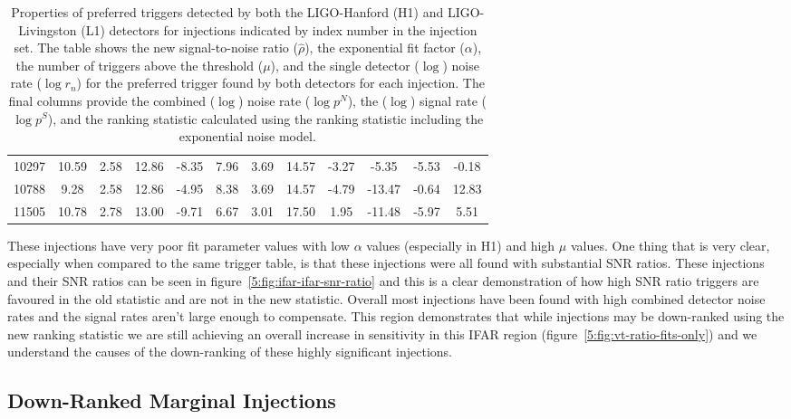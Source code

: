 \begin{table}[ht]
\begin{tabular}{lccccccccccc}
        10297 & 10.59 & 2.58 & 12.86 & -8.35 & 7.96 & 3.69 & 14.57 & -3.27 & -5.35 & -5.53 & -0.18 \\
        10788 & 9.28 & 2.58 & 12.86 & -4.95 & 8.38 & 3.69 & 14.57 & -4.79 & -13.47 & -0.64 & 12.83 \\
        11505 & 10.78 & 2.78 & 13.00 & -9.71 & 6.67 & 3.01 & 17.50 & 1.95 & -11.48 & -5.97 & 5.51 \\
        \bottomrule
    \end{tabular}
    \caption{Properties of preferred triggers detected by both the LIGO-Hanford (H1) and LIGO-Livingston (L1) detectors for injections indicated by index number in the injection set. The table shows the new signal-to-noise ratio ($\hat{\rho}$), the exponential fit factor ($\alpha$), the number of triggers above the threshold ($\mu$), and the single detector ($\log$) noise rate ($\log r_n$) for the preferred trigger found by both detectors for each injection. The final columns provide the combined ($\log$) noise rate ($\log p^{N}$), the ($\log$) signal rate ($\log p^{S}$), and the ranking statistic calculated using the ranking statistic including the exponential noise model.}
    \label{5:tab:top-right-diff-temp-fits}
\end{table}
%
These injections have very poor fit parameter values with low $\alpha$ values (especially in H1) and high $\mu$ values. One thing that is very clear, especially when compared to the same trigger table, is that these injections were all found with substantial SNR ratios. These injections and their SNR ratios can be seen in figure~\ref{5:fig:ifar-ifar-snr-ratio} and this is a clear demonstration of how high SNR ratio triggers are favoured in the old statistic and are not in the new statistic. Overall most injections have been found with high combined detector noise rates and the signal rates aren't large enough to compensate. This region demonstrates that while injections may be down-ranked using the new ranking statistic we are still achieving an overall increase in sensitivity in this IFAR region (figure~\ref{5:fig:vt-ratio-fits-only}) and we understand the causes of the down-ranking of these highly significant injections.


\subsection{\label{5:sec:middle-region}Down-Ranked Marginal Injections}

